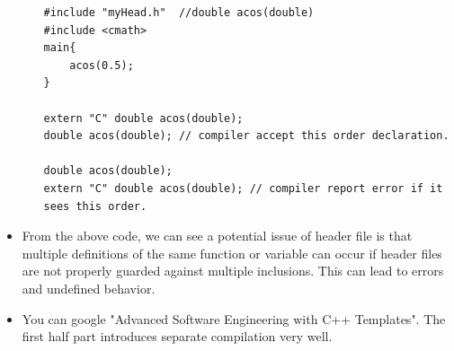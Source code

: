 \documentclass[a4paper,11pt,twoside]{book}
\begin{document}
\begin{itemize}
\begin{enumerate}
\begin{lstlisting}[numbers=none]
#include "myHead.h"  //double acos(double)
#include <cmath>
main{
	acos(0.5);
}

extern "C" double acos(double);
double acos(double); // compiler accept this order declaration.

double acos(double); 
extern "C" double acos(double); // compiler report error if it sees this order.
\end{lstlisting}
    		
	\end{enumerate}

	\item From the above code, we can see a potential issue of header file is that multiple definitions of the same function or variable can occur if header files are not properly guarded against multiple inclusions. This can lead to errors and undefined behavior.
	
	\item You can google "Advanced Software Engineering with C++ Templates". The first half part introduces separate compilation very well.
\end{itemize}
\end{document}
